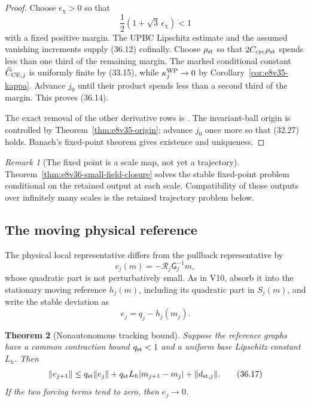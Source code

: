 \documentclass[11pt,oneside]{book}
\newtheorem{theorem}{Theorem}[chapter]
\theoremstyle{definition}
\theoremstyle{remark}
\newtheorem{remark}[theorem]{Remark}
\begin{document}
\begin{proof}
Choose \(\epsilon_\chi>0\) so that
\[
 \frac12(1+\sqrt3\,\epsilon_\chi)<1
\]
with a fixed positive margin.  The UPBC Lipschitz estimate and the
assumed vanishing increments
supply (36.12) cofinally.
Choose \(\rho_{\rm st}\) so that
\(2C_{\rm cyc}\rho_{\rm st}\) spends less than one third of the
remaining margin.  The marked conditional constant
\(\widehat C_{{\rm CE},j}\) is uniformly finite by (33.15), while
\(\kappa_j^{\rm WP}\to0\) by
Corollary~\ref{cor:e8v35-kappa}.  Advance \(j_0\) until their product
spends less than a second third of the margin.  This proves (36.14).

The exact removal of the other derivative rows is
.  The invariant-ball origin is
controlled by Theorem~\ref{thm:e8v35-origin}; advance \(j_0\) once
more so that (32.27) holds.  Banach's fixed-point theorem gives
existence and uniqueness.
\end{proof}

\begin{remark}[The fixed point is a scale map, not yet a trajectory]
\label{rem:e8v36-step-versus-path}
Theorem~\ref{thm:e8v36-small-field-closure} solves the stable
fixed-point problem conditional on the retained output at each
scale.  Compatibility of those outputs over infinitely many scales
is the retained trajectory problem below.
\end{remark}

\subsection{The moving physical reference}

The physical local representative differs from the pullback
representative by
\[
                         c_j(m)=-{\mathscr R}_j{\mathsf G}_j^{-1}m,
                                                                    \tag{36.15}
\]
whose quadratic part is not perturbatively small.  As in V10, absorb
it into the stationary moving reference \(h_j(m)\), including its
quadratic part in \(S_j(m)\), and write the stable deviation as
\[
                              e_j=q_j-h_j(m_j).                   \tag{36.16}
\]

\begin{theorem}[Nonautonomous tracking bound]
\label{thm:e8v36-tracking}
Suppose the reference graphs have a common contraction bound
\(q_{\rm st}<1\) and a uniform base Lipschitz constant \(L_h\).
Then
\[
 \|e_{j+1}\|
 \leq
 q_{\rm st}\|e_j\|
 +q_{\rm st}L_h|m_{j+1}-m_j|
 +\|d_{{\rm st},j}\|.                                            \tag{36.17}
\]
If the two forcing terms tend to zero, then \(e_j\to0\).
\end{theorem}
\end{document}
